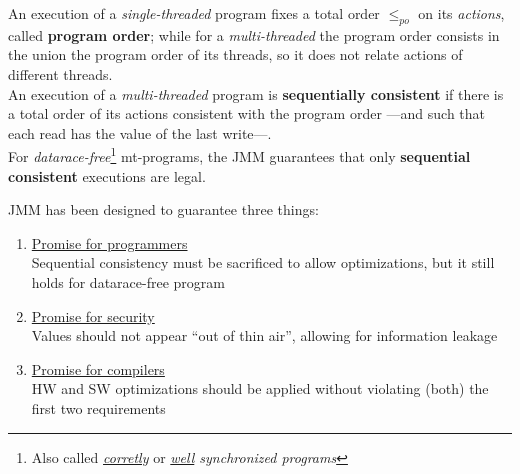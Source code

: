 

An execution of a \textit{single-threaded} program fixes a total order $\leq_{po}$ on its \textit{actions}, called \textbf{program order};
while for a \textit{multi-threaded} the program order consists in the union the program order of its threads,
so it does not relate actions of different threads.\\
An execution of a \textit{multi-threaded} program is \textbf{sequentially consistent} if there is a total order of its actions consistent with the program order {---}and such that each read has the value of the last write{---}.\\
For \textit{datarace-free}\footnote{Also called \textit{\underline{corretly}} or \textit{\underline{well} synchronized programs}} mt-programs, the JMM guarantees that only \textbf{sequential consistent} executions are legal.

{JMM has been designed to guarantee three things:\ns
\begin{enumerate}
   \item \ul{Promise for programmers}\\
   Sequential consistency must be sacrificed to allow optimizations, 
   but it still holds for datarace-free program
   \item \ul{Promise for security}\\
   Values should not appear ``out of thin air'', allowing for information leakage
   \item \ul{Promise for compilers}\\
   HW and SW optimizations should be applied without violating (both) the first two requirements
\end{enumerate}}

